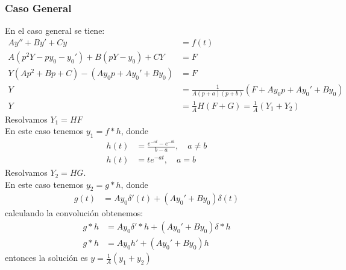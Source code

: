 \documentclass{article}
\begin{document}
\begin{tcolorbox}[breakable]
    \subsubsection*{Caso General}
    En el caso general se tiene:
    \begin{align*}
        Ay'' + By' + Cy &= f(t)\\
        A(p^2Y - py_0 - y_0') + B(pY - y_0) + CY &= F \\
        Y(Ap^2 + Bp + C) - (Ay_0p + Ay_0' + By_0) &= F \\
        Y &= \frac{1}{A(p+a)(p+b)}(F + Ay_0p + Ay_0' + By_0) \\
        Y &= \frac{1}{A}H(F + G) = \frac{1}{A} (Y_1 + Y_2) 
    \end{align*} 
    Resolvamos $Y_1 = HF$ \\ 
    En este caso tenemos $y_1 = f*h$, donde 
    \begin{align*}
        h(t) &= \frac{e^{-at} - e^{-bt}}{b-a},\quad a \neq b \\ 
        h(t) &= te^{-at},\quad a=b
    \end{align*}
    Resolvamos $Y_2 = HG$. \\
    En este caso tenemos $y_2 = g*h$, donde 
    \begin{align*}
        g(t) &= Ay_0\delta'(t) + (Ay_0' + By_0)\delta(t)
    \end{align*}
    calculando la convolución obtenemos:
    \begin{align*}
        g*h &=Ay_0 \delta'*h + (Ay_0' + By_0) \delta*h \\
        g*h &=Ay_0h' + (Ay_0' + By_0)h
    \end{align*}
    entonces la solución es $y = \frac{1}{A} (y_1 + y_2)$

\end{tcolorbox}
\end{document}
